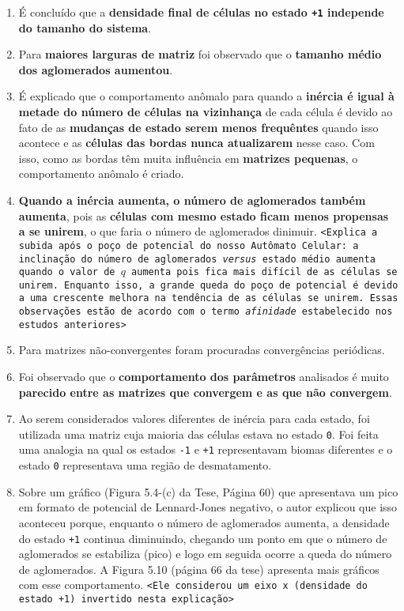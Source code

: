 \documentclass[12pt,a4paper,final]{article}
\begin{document}
\begin{enumerate}
    \item É concluído que a \textbf{densidade final de células no estado \texttt{+1} independe do tamanho do sistema}.
    \item Para \textbf{maiores larguras de matriz} foi observado que o \textbf{tamanho médio dos aglomerados aumentou}.
    \item É explicado que o comportamento anômalo para quando a \textbf{inércia é igual à metade do número de células na vizinhança} de cada célula é devido ao fato de as \textbf{mudanças de estado serem menos frequêntes} quando isso acontece e as \textbf{células das bordas nunca atualizarem} nesse caso. Com isso, como as bordas têm muita influência em \textbf{matrizes pequenas}, o comportamento anômalo é criado.
    \item \textbf{Quando a inércia aumenta, o número de aglomerados também aumenta}, pois as \textbf{células com mesmo estado ficam menos propensas a se unirem}, o que faria o número de aglomerados dinimuir. \texttt{<Explica a subida após o poço de potencial do nosso Autômato Celular: a inclinação do número de aglomerados \textit{versus} estado médio aumenta quando o valor de $q$ aumenta pois fica mais difícil de as células se unirem. Enquanto isso, a grande queda do poço de potencial é devido a uma crescente melhora na tendência de as células se unirem. Essas observações estão de acordo com o termo \textit{afinidade} estabelecido nos estudos anteriores>}
    \item Para matrizes não-convergentes foram procuradas convergências periódicas.
    \item Foi observado que o \textbf{comportamento dos parâmetros} analisados é muito \textbf{parecido entre as matrizes que convergem e as que não convergem}.
    \item Ao serem considerados valores diferentes de inércia para cada estado, foi utilizada uma matriz cuja maioria das células estava no estado \texttt{0}. Foi feita uma analogia na qual os estados \texttt{-1} e \texttt{+1} representavam biomas diferentes e o estado \texttt{0} representava uma região de desmatamento.
    \item Sobre um gráfico (Figura 5.4-(c) da Tese, Página 60) que apresentava um pico em formato de potencial de Lennard-Jones negativo, o autor explicou que isso aconteceu porque, enquanto o número de aglomerados aumenta, a densidade do estado \texttt{+1} continua diminuindo, chegando um ponto em que o número de aglomerados se estabiliza (pico) e logo em seguida ocorre a queda do número de aglomerados. A Figura 5.10 (página 66 da tese) apresenta mais gráficos com esse comportamento. \texttt{<Ele considerou um eixo x (densidade do estado +1) invertido nesta explicação>}

\end{enumerate}
\end{document}

